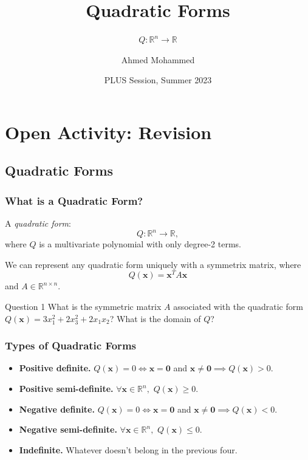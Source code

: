 \documentclass{beamer}
\title{Quadratic Forms}
\subtitle{\(Q \colon \mathbb{R}^n \to \mathbb{R}\)}
\author{Ahmed Mohammed}
\institute{Georgia Institute of Technology}
\date{PLUS Session, Summer 2023}
\renewcommand{\vec}[1]{\bm{#1}}
\begin{document}
	\begin{frame}
		\maketitle
	\end{frame}

	\section{Open Activity: Revision}
	\subsection{Quadratic Forms}
	\begin{frame}
		\frametitle{What is a Quadratic Form?}
		A \emph{quadratic form}:\pause
		\[Q \colon \mathbb{R}^n \to \mathbb{R},\] where \(Q\) is a multivariate polynomial with only degree-2 terms. \pause

		We can represent any quadratic form uniquely with a symmetrix matrix, where \[Q(\vec{x}) = \vec{x}^TA\vec{x}\] and 
		\(A \in \mathbb{R}^{n \times n}\). \pause
		
		\begin{exampleblock}{Question 1}
			What is the symmetric matrix \(A\) associated with the quadratic form \(Q(\vec{x}) = 3x^2_1 + 2x_3^2 + 2x_1x_2\)? What is the domain
			of \(Q\)?
		\end{exampleblock}
	\end{frame}
	
	\begin{frame}
		\frametitle{Types of Quadratic Forms}
		\begin{itemize}[<alert@+>]
			\item \textbf{Positive definite.} \(Q(\vec{x})  = 0 \iff \vec{x} = \vec{0}\) and \(\vec{x} \ne \vec{0} \implies Q(\vec{x}) > 0\).
			\item \textbf{Positive semi-definite.} \(\forall \vec{x} \in \mathbb{R}^n,\) \(Q(\vec{x}) \ge 0\).
			\item \textbf{Negative definite.} \(Q(\vec{x})  = 0 \iff \vec{x} = \vec{0}\) and \(\vec{x} \ne \vec{0} \implies Q(\vec{x}) < 0\).
			\item \textbf{Negative semi-definite.} \(\forall \vec{x} \in \mathbb{R}^n,\) \(Q(\vec{x}) \le 0\).
			\item \textbf{Indefinite.} Whatever doesn't belong in the previous four.
		\end{itemize}
	\end{frame}
\end{document}
